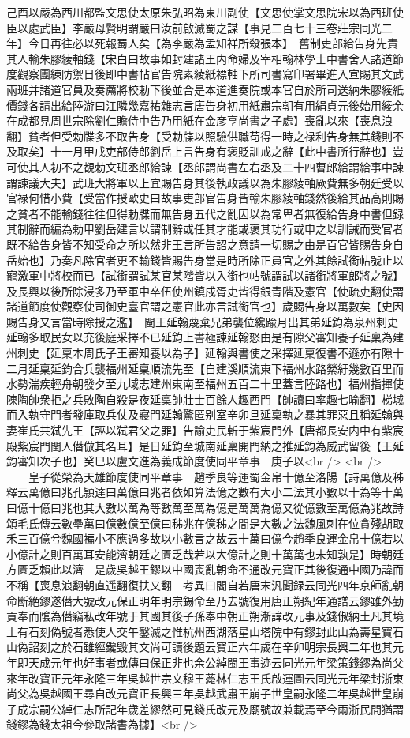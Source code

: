 己酉以嚴為西川都監文思使太原朱弘昭為東川副使【文思使掌文思院宋以為西班使臣以處武臣】李嚴母賢明謂嚴曰汝前啟滅蜀之謀【事見二百七十三卷莊宗同光二年】今日再往必以死報蜀人矣【為李嚴為孟知祥所殺張本】　舊制吏部給告身先責其人輸朱膠綾軸錢【宋白曰故事如封建諸王内命婦及宰相翰林學士中書舍人諸道節度觀察團練防禦日後即中書帖官告院素綾紙褾軸下所司書寫印署畢進入宣賜其文武兩班并諸道官員及奏薦將校勅下後並合是本道進奏院或本官自於所司送納朱膠綾紙價錢各請出給陸游曰江隣幾嘉祐雜志言唐告身初用紙肅宗朝有用絹貞元後始用綾余在成都見周世宗除劉仁贍侍中告乃用紙在金彦亨尚書之子處】喪亂以來【喪息浪翻】貧者但受勅牒多不取告身【受勅牒以照驗供職苟得一時之禄利告身無其錢則不及取矣】十一月甲戌吏部侍郎劉岳上言告身有褒貶訓戒之辭【此中書所行辭也】豈可使其人初不之覩勅文班丞郎給諫【丞郎謂尚書左右丞及二十四曹郎給謂給事中諫謂諫議大夫】武班大將軍以上宜賜告身其後執政議以為朱膠綾軸厥費無多朝廷受以官禄何惜小費【受當作授歐史曰故事吏部官告身皆輸朱膠綾軸錢然後給其品高則賜之貧者不能輸錢往往但得勅牒而無告身五代之亂因以為常卑者無復給告身中書但録其制辭而編為勅甲劉岳建言以謂制辭或任其才能或褒其功行或申之以訓誡而受官者既不給告身皆不知受命之所以然非王言所告詔之意請一切賜之由是百官皆賜告身自岳始也】乃奏凡除官者更不輸錢皆賜告身當是時所除正員官之外其餘試銜帖號止以寵激軍中將校而已【試銜謂試某官某階皆以入銜也帖號謂試以諸銜將軍郎將之號】及長興以後所除浸多乃至軍中卒伍使州鎮戍胥吏皆得銀青階及憲官【使疏吏翻使謂諸道節度使觀察使司御史臺官謂之憲官此亦言試銜官也】歲賜告身以萬數矣【史因賜告身又言當時除授之濫】　閩王延翰蔑棄兄弟襲位纔踰月出其弟延鈞為泉州刺史延翰多取民女以充後庭采擇不已延鈞上書極諫延翰怒由是有隙父審知養子延稟為建州刺史【延稟本周氏子王審知養以為子】延翰與書使之采擇延稟復書不遜亦有隙十二月延稟延鈞合兵襲福州延稟順流先至【自建溪順流東下福州水路縈紆幾數百里而水勢湍疾輕舟朝發夕至九域志建州東南至福州五百二十里蓋言陸路也】福州指揮使陳陶帥衆拒之兵敗陶自殺是夜延稟帥壯士百餘人趣西門【帥讀曰率趣七喻翻】梯城而入執守門者發庫取兵仗及寢門延翰驚匿别室辛卯旦延稟執之暴其罪惡且稱延翰與妻崔氏共弑先王【誣以弑君父之罪】告諭吏民斬于紫宸門外【唐都長安内中有紫宸殿紫宸門閩人僭倣其名耳】是日延鈞至城南延稟開門納之推延鈞為威武留後【王延鈞審知次子也】癸巳以盧文進為義成節度使同平章事　庚子以<br />
<br />
　　皇子從榮為天雄節度使同平章事　趙季良等運蜀金帛十億至洛陽【詩萬億及秭釋云萬億曰兆孔頴達曰萬億曰兆者依如算法億之數有大小二法其小數以十為等十萬曰億十億曰兆也其大數以萬為等數萬至萬為億是萬萬為億又從億數至萬億為兆故詩頌毛氏傳云數壘萬曰億數億至億曰秭兆在億秭之間是大數之法魏風刺在位貪殘胡取禾三百億兮魏國褊小不應過多故以小數言之故云十萬曰億今趙季良運金帛十億若以小億計之則百萬耳安能濟朝廷之匱乏哉若以大億計之則十萬萬也未知孰是】時朝廷方匱乏賴此以濟　是歲吳越王鏐以中國喪亂朝命不通改元寶正其後復通中國乃諱而不稱【喪息浪翻朝直遥翻復扶又翻　考異曰閻自若唐末汎聞録云同光四年京師亂朝命斷絶鏐遂僭大號改元保正明年明宗錫命至乃去號復用唐正朔紀年通譜云鏐雖外勤貢奉而隂為僭竊私改年號于其國其後子孫奉中朝正朔漸諱改元事及錢俶納土凡其境土有石刻偽號者悉使人交午鑿滅之惟杭州西湖落星山塔院中有鏐封此山為壽星寶石山偽詔刻之於石雖經鑱毁其文尚可讀後題云寶正六年歲在辛卯明宗長興二年也其元年即天成元年也好事者或傳曰保正非也余公綽閩王事迹云同光元年梁策錢鏐為尚父來年改寶正元年永隆三年吳越世宗文穆王薨林仁志王氏啟運圖云同光元年梁封浙東尚父為吳越國王尋自改元寶正長興三年吳越武肅王崩子世皇嗣永隆二年吳越世皇崩子成宗嗣公綽仁志所記年歲差繆然可見錢氏改元及廟號故兼載焉至今兩浙民間猶謂錢鏐為錢太祖今參取諸書為據】<br />
